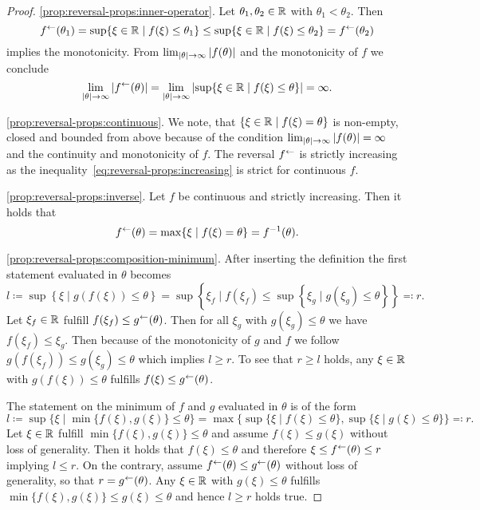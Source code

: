 \begin{proof}
    \ref{prop:reversal-props:inner-operator}. 
    Let $\theta_1, \theta_2\in\mathbb{R}$ with $\theta_1 < \theta_2$.
    Then \begin{equation}\label{eq:reversal-props:increasing}
        f^{\leftarrow}(\theta_1) = \sup\{\xi\in\mathbb{R} \mid f(\xi) \leq \theta_1 \}
        \leq \sup\{\xi\in\mathbb{R} \mid f(\xi)\leq \theta_2 \} = f^{\leftarrow}(\theta_2)
    \end{equation}
    implies the monotonicity.
    From $\lim_{\left| \theta \right|\rightarrow \infty} \left| f(\theta) \right|$ and the monotonicity of $f$ we conclude \[
        \lim_{\left| \theta \right|\rightarrow \infty} \left| f^{\leftarrow}(\theta) \right|
        = \lim_{\left| \theta \right|\rightarrow \infty} \left|  \sup\{\xi\in\mathbb{R} \mid f(\xi)\leq \theta \}  \right| = \infty.
    \]

    \ref{prop:reversal-props:continuous}.
    We note, that $\{ \xi\in\mathbb{R} \mid f(\xi) = \theta \}$ is non-empty, closed and bounded from above because of the condition $\lim_{\left| \theta \right|\rightarrow \infty} \left| f(\theta) \right| = \infty$ and the continuity and monotonicity of $f$.
    The reversal $f^{\leftarrow}$ is strictly increasing as the inequality~\eqref{eq:reversal-props:increasing} is strict for continuous $f$.
    
    \ref{prop:reversal-props:inverse}.
    Let $f$ be continuous and strictly increasing.
    Then it holds that 
    \[
        f^{\leftarrow}(\theta) = \max\{\xi\mid f(\xi) = \theta \} = f^{-1}(\theta).
    \]

    \ref{prop:reversal-props:composition-minimum}.
    After inserting the definition the first statement evaluated in $\theta$ becomes
    \[
        l\coloneqq \sup\left\{
            \xi \mid g(f(\xi)) \leq \theta
        \right\}
        =
        \sup\left\{
            \xi_f \mid f(\xi_f) \leq
            \sup\left\{ \xi_g \mid g(\xi_g) \leq \theta \right\}
            \right\}
         \eqqcolon r.
    \]
    Let $\xi_f\in\mathbb{R}$ fulfill $f(\xi_f) \leq g^{\leftarrow}(\theta)$.
    Then for all $\xi_g$ with $g(\xi_g) \leq \theta$ we have $f(\xi_f) \leq \xi_g$.
    Then because of the monotonicity of $g$ and $f$ we follow $g(f(\xi_f)) \leq g(\xi_g) \leq \theta$ which implies $l \geq r$.
    To see that $r\geq l$ holds, any $\xi\in\mathbb{R}$ with $g(f(\xi)) \leq \theta$ fulfills $f(\xi)\leq g^{\leftarrow}(\theta)$.

    The statement on the minimum of $f$ and $g$ evaluated in $\theta$ is of the form
    \[
        l\coloneqq \sup\{\xi \mid \min\{f(\xi),g(\xi)\} \leq \theta \}
        =
        \max\{
            \sup\{\xi \mid f(\xi)\leq \theta \},
            \sup\{\xi\mid g(\xi)\leq\theta\}
        \} \eqqcolon r.
    \]
    Let $\xi\in\mathbb{R}$ fulfill $\min\{f(\xi),g(\xi)\}\leq \theta$ and assume $f(\xi)\leq g(\xi)$ without loss of generality.
    Then it holds that $f(\xi) \leq \theta$ and therefore $\xi \leq f^{\leftarrow}(\theta)\leq r$ implying $l\leq r$.
    On the contrary, assume $f^{\leftarrow}(\theta)\leq g^{\leftarrow}(\theta)$ without loss of generality, so that $r = g^{\leftarrow}(\theta)$.
    Any $\xi\in\mathbb{R}$ with $g(\xi)\leq \theta$ fulfills $\min\{f(\xi),g(\xi)\}\leq g(\xi)\leq\theta$ and hence $l \geq r$ holds true.


\end{proof}
